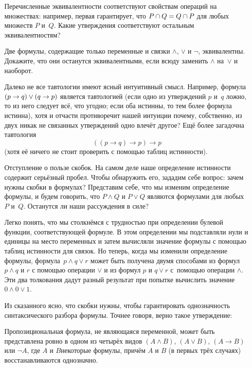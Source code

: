 \begin{problem}
Перечисленные эквивалентности соответствуют свойствам операций на множествах:
например, первая гарантирует, что $P\hm\cap Q\hm=Q\hm\cap P$
для любых множеств $P$ и~$Q$. Какие утверждения соответствуют
остальным эквивалентностям?
\end{problem}

\begin{problem}
Две формулы, содержащие только переменные и связки $\land$,
$\lor$ и $\lnot$, эквивалентны. Докажите, что они останутся
эквивалентными, если всюду заменить $\land$ на~$\lor$ и
наоборот.
\end{problem}

Далеко не все тавтологии имеют ясный интуитивный
смысл. Например, формула ${(p\to q)}\hm\lor{(q\to p)}$ является
тавтологией (если одно из утверждений $p$ и~$q$ ложно, то из
него следует всё, что угодно; если оба истинны, то тем более
формула истинна), хотя и отчасти противоречит нашей интуиции\т
почему, собственно, из двух никак не связанных утверждений одно
влечёт другое? Ещё более загадочна тавтология
        $$
((p\to q)\to p)\to p
        $$
(хотя её ничего не стоит проверить с помощью таблиц истинности).

\bigskip

\textsf{Отступление о пользе скобок}.%
На самом деле наше оп\-ре\-де\-ле\-ние истинности содержит серьёзный
пробел. Чтобы обнаружить его, зададим себе вопрос: зачем нужны
скобки в формулах? Представим себе, что мы изменим определение
формулы, и будем говорить, что $P \land Q$ и $P \lor Q$ являются
формулами для любых $P$ и~$Q$. Останутся ли наши рассуждения в
силе?

Легко понять, что мы столкнёмся с трудностью при определении
булевой функции, соответствующей формуле. В этом определении
мы подставляли нули и единицы на место переменных и затем
вычисляли значение формулы с помощью таблиц истинности для
связок. Но теперь, когда мы изменили определение формулы,
формула~$p\land q \lor r$ может быть получена двумя способами\т
из формул $p\land q$ и $r$ с помощью операции $\lor$ и из
формул $p$ и $q\lor r$ с~помощью операции $\land$. Эти два
толкования дадут разный результат при попытке вычислить
значение~$0 \land 0 \lor 1$.

Из сказанного ясно, что скобки нужны, чтобы гарантировать однозначность
синтаксического разбора формулы. Точнее говоря, верно такое
утверждение:

\begin{theorem}
%
Пропозициональная формула, не являющаяся переменной, может быть
представлена ровно в одном из четырёх видов $(A\land B)$, $(A\lor
B)$, $(A\to B)$
или $\lnot A$, где $A$ и $B$\т некоторые формулы, причём $A$
и $B$ (в первых трёх случаях) восстанавливаются однозначно.
\end{theorem}


